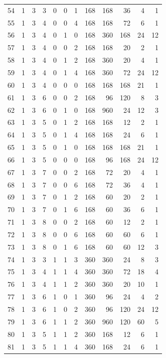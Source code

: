 \documentclass[11pt,a4paper]{article}
\begin{document}
\begin{longtable}{r|rrr|rrr|rrr|rr}
54 & 1 & 3 & 3 & 0 & 0 & 1 & 168 & 168 & 36 & 4 & 1\\
55 & 1 & 3 & 4 & 0 & 0 & 4 & 168 & 168 & 72 & 6 & 1\\
56 & 1 & 3 & 4 & 0 & 1 & 0 & 168 & 360 & 168 & 24 & 12\\
57 & 1 & 3 & 4 & 0 & 0 & 2 & 168 & 168 & 20 & 2 & 1\\
58 & 1 & 3 & 4 & 0 & 1 & 2 & 168 & 360 & 20 & 4 & 1\\
59 & 1 & 3 & 4 & 0 & 1 & 4 & 168 & 360 & 72 & 24 & 12\\
60 & 1 & 3 & 4 & 0 & 0 & 0 & 168 & 168 & 168 & 21 & 1\\
61 & 1 & 3 & 6 & 0 & 0 & 2 & 168 & 96 & 120 & 8 & 3\\
62 & 1 & 3 & 6 & 0 & 1 & 0 & 168 & 960 & 24 & 12 & 3\\
63 & 1 & 3 & 5 & 0 & 1 & 2 & 168 & 168 & 12 & 2 & 1\\
64 & 1 & 3 & 5 & 0 & 1 & 4 & 168 & 168 & 24 & 6 & 1\\
65 & 1 & 3 & 5 & 0 & 1 & 0 & 168 & 168 & 168 & 21 & 1\\
66 & 1 & 3 & 5 & 0 & 0 & 0 & 168 & 96 & 168 & 24 & 12\\
67 & 1 & 3 & 7 & 0 & 0 & 2 & 168 & 72 & 20 & 4 & 1\\
68 & 1 & 3 & 7 & 0 & 0 & 6 & 168 & 72 & 36 & 4 & 1\\
69 & 1 & 3 & 7 & 0 & 1 & 2 & 168 & 60 & 20 & 2 & 1\\
70 & 1 & 3 & 7 & 0 & 1 & 6 & 168 & 60 & 36 & 6 & 1\\
71 & 1 & 3 & 8 & 0 & 0 & 2 & 168 & 60 & 12 & 2 & 1\\
72 & 1 & 3 & 8 & 0 & 0 & 6 & 168 & 60 & 60 & 6 & 1\\
73 & 1 & 3 & 8 & 0 & 1 & 6 & 168 & 60 & 60 & 12 & 3\\
74 & 1 & 3 & 3 & 1 & 1 & 3 & 360 & 360 & 24 & 8 & 3\\
75 & 1 & 3 & 4 & 1 & 1 & 4 & 360 & 360 & 72 & 18 & 4\\
76 & 1 & 3 & 4 & 1 & 1 & 2 & 360 & 360 & 20 & 10 & 1\\
77 & 1 & 3 & 6 & 1 & 0 & 1 & 360 & 96 & 24 & 4 & 2\\
78 & 1 & 3 & 6 & 1 & 0 & 2 & 360 & 96 & 120 & 24 & 12\\
79 & 1 & 3 & 6 & 1 & 1 & 2 & 360 & 960 & 120 & 60 & 5\\
80 & 1 & 3 & 5 & 1 & 1 & 2 & 360 & 168 & 12 & 6 & 1\\
81 & 1 & 3 & 5 & 1 & 1 & 4 & 360 & 168 & 24 & 6 & 1\\

\end{longtable}
\end{document}
